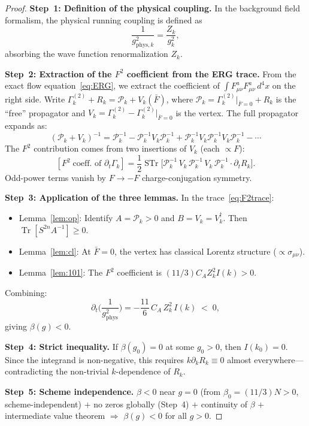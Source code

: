 \documentclass[12pt,a4paper]{article}
\theoremstyle{plain}
\theoremstyle{definition}
\theoremstyle{remark}
\begin{document}
\begin{proof}
\textbf{Step~1: Definition of the physical coupling.} In the background field formalism, the physical running coupling is defined as
\begin{equation}\label{eq:gphys}
\frac{1}{g_{\mathrm{phys},k}^2} = \frac{Z_k}{g_k^2},
\end{equation}
absorbing the wave function renormalization $Z_k$.

\textbf{Step~2: Extraction of the $F^2$ coefficient from the ERG trace.} From the exact flow equation~\eqref{eq:ERG}, we extract the coefficient of $\int F_{\mu\nu}^a F_{\mu\nu}^a\,d^4x$ on the right side. Write $\Gamma_k^{(2)}+R_k = \mathcal{P}_k+V_k(\bar{F})$, where $\mathcal{P}_k=\Gamma_k^{(2)}|_{\bar{F}=0}+R_k$ is the ``free'' propagator and $V_k=\Gamma_k^{(2)}-\Gamma_k^{(2)}|_{\bar{F}=0}$ is the vertex. The full propagator expands as:
\begin{equation}\label{eq:Neumann}
(\mathcal{P}_k+V_k)^{-1} = \mathcal{P}_k^{-1} - \mathcal{P}_k^{-1}V_k\mathcal{P}_k^{-1} + \mathcal{P}_k^{-1}V_k\mathcal{P}_k^{-1}V_k\mathcal{P}_k^{-1} - \cdots
\end{equation}
The $F^2$ contribution comes from two insertions of $V_k$ (each $\propto F$):
\begin{equation}\label{eq:F2trace}
[F^2\;\text{coeff. of }\partial_t\Gamma_k] = \frac{1}{2}\operatorname{STr}\big[\mathcal{P}_k^{-1}\,V_k\,\mathcal{P}_k^{-1}\,V_k\,\mathcal{P}_k^{-1}\cdot\partial_t R_k\big].
\end{equation}
Odd-power terms vanish by $F\to-F$ charge-conjugation symmetry.

\textbf{Step~3: Application of the three lemmas.} In the trace~\eqref{eq:F2trace}:
\begin{itemize}[nosep]
\item Lemma~\ref{lem:op}: Identify $A=\mathcal{P}_k>0$ and $B=V_k=V_k^\dagger$. Then $\operatorname{Tr}[S^{2n}A^{-1}]\geq 0$.
\item Lemma~\ref{lem:cl}: At $\bar{F}=0$, the vertex has classical Lorentz structure ($\propto\sigma_{\mu\nu}$).
\item Lemma~\ref{lem:101}: The $F^2$ coefficient is $(11/3)C_A Z_k^2 I(k)>0$.
\end{itemize}
Combining:
\begin{equation}\label{eq:betaflow}
\partial_t\!\bigg(\frac{1}{g_{\mathrm{phys}}^2}\bigg) = -\frac{11}{6}\,C_A\,Z_k^2\,I(k) \;<\; 0,
\end{equation}
giving $\beta(g)<0$.

\textbf{Step~4: Strict inequality.} If $\beta(g_0)=0$ at some $g_0>0$, then $I(k_0)=0$. Since the integrand is non-negative, this requires $k\partial_kR_k\equiv 0$ almost everywhere---contradicting the non-trivial $k$-dependence of $R_k$.

\textbf{Step~5: Scheme independence.} $\beta<0$ near $g=0$ (from $\beta_0=(11/3)N>0$, scheme-independent) $+$ no zeros globally (Step~4) $+$ continuity of $\beta$ $+$ intermediate value theorem $\Rightarrow$ $\beta(g)<0$ for all $g>0$.
\end{proof}
\end{document}
